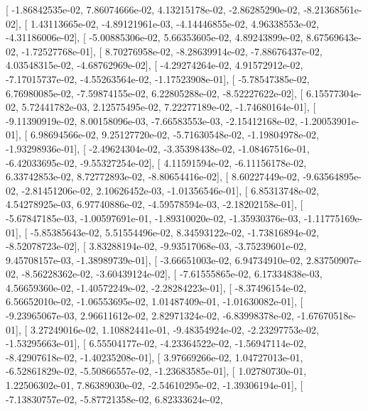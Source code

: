 \documentclass{article}
\begin{document}
       [ -1.86842535e-02,   7.86074666e-02,   4.13215178e-02,
         -2.86285290e-02,  -8.21368561e-02],
       [  1.43113665e-02,  -4.89121961e-03,  -4.14446855e-02,
          4.96338553e-02,  -4.31186006e-02],
       [ -5.00885306e-02,   5.66353605e-02,   4.89243899e-02,
          8.67569643e-02,  -1.72527768e-01],
       [  8.70276958e-02,  -8.28639914e-02,  -7.88676437e-02,
          4.03548315e-02,  -4.68762969e-02],
       [ -4.29274264e-02,   4.91572912e-02,  -7.17015737e-02,
         -4.55263564e-02,  -1.17523908e-01],
       [ -5.78547385e-02,   6.76980085e-02,  -7.59874155e-02,
          6.22805288e-02,  -8.52227622e-02],
       [  6.15577304e-02,   5.72441782e-03,   2.12575495e-02,
          7.22277189e-02,  -1.74680164e-01],
       [ -9.11390919e-02,   8.00158096e-03,  -7.66583553e-03,
         -2.15412168e-02,  -1.20053901e-01],
       [  6.98694566e-02,   9.25127720e-02,  -5.71630548e-02,
         -1.19804978e-02,  -1.93298936e-01],
       [ -2.49624304e-02,  -3.35398438e-02,  -1.08467516e-01,
         -6.42033695e-02,  -9.55327254e-02],
       [  4.11591594e-02,  -6.11156178e-02,   6.33742853e-02,
          8.72772893e-02,  -8.80654416e-02],
       [  8.60227449e-02,  -9.63564895e-02,  -2.81451206e-02,
          2.10626452e-03,  -1.01356546e-01],
       [  6.85313748e-02,   4.54278925e-03,   6.97740886e-02,
         -4.59578594e-03,  -2.18202158e-01],
       [ -5.67847185e-03,  -1.00597691e-01,  -1.89310020e-02,
         -1.35930376e-03,  -1.11775169e-01],
       [ -5.85385643e-02,   5.51554496e-02,   8.34593122e-02,
         -1.73816894e-02,  -8.52078723e-02],
       [  3.83288194e-02,  -9.93517068e-03,  -3.75239601e-02,
          9.45708157e-03,  -1.38989739e-01],
       [ -3.66651003e-02,   6.94734910e-02,   2.83750907e-02,
         -8.56228362e-02,  -3.60439124e-02],
       [ -7.61555865e-02,   6.17334838e-03,   4.56659360e-02,
         -1.40572249e-02,  -2.28284223e-01],
       [ -8.37496154e-02,   6.56652010e-02,  -1.06553695e-02,
          1.01487409e-01,  -1.01630082e-01],
       [ -9.23965067e-03,   2.96611612e-02,   2.82971324e-02,
         -6.83998378e-02,  -1.67670518e-01],
       [  3.27249016e-02,   1.10882441e-01,  -9.48354924e-02,
         -2.23297753e-02,  -1.53295663e-01],
       [  6.55504177e-02,  -4.23364522e-02,  -1.56947114e-02,
         -8.42907618e-02,  -1.40235208e-01],
       [  3.97669266e-02,   1.04727013e-01,  -6.52861829e-02,
         -5.50866557e-02,  -1.23683585e-01],
       [  1.02780730e-01,   1.22506302e-01,   7.86389030e-02,
         -2.54610295e-02,  -1.39306194e-01],
       [ -7.13830757e-02,  -5.87721358e-02,   6.82333624e-02,
\end{document}
